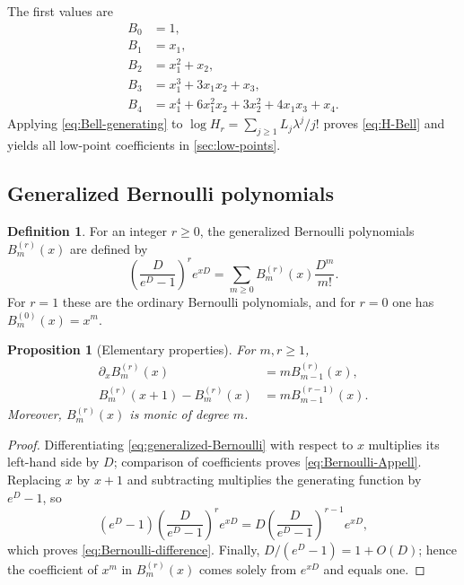 \documentclass[11pt,a4paper]{amsart}
\numberwithin{equation}{section}
\newtheorem{proposition}[theorem]{Proposition}
\theoremstyle{definition}
\newtheorem{definition}[theorem]{Definition}
\theoremstyle{remark}
\newcommand{\e}{e}
\begin{document}
The first values are
\begin{align*}
 B_0&=1,\\
 B_1&=x_1,\\
 B_2&=x_1^2+x_2,\\
 B_3&=x_1^3+3x_1x_2+x_3,\\
 B_4&=x_1^4+6x_1^2x_2+3x_2^2+4x_1x_3+x_4.
\end{align*}
Applying \eqref{eq:Bell-generating} to
$\log H_r=\sum_{j\geq1}L_j\lambda^j/j!$ proves
\eqref{eq:H-Bell} and yields all low-point coefficients in
\cref{sec:low-points}.

\subsection{Generalized Bernoulli polynomials}
\label{app:bernoulli}

\begin{definition}
For an integer $r\geq0$, the generalized Bernoulli polynomials
$B_m^{(r)}(x)$ are defined by
\begin{equation}
 \left(\frac{D}{\e^D-1}\right)^r\e^{xD}
 =\sum_{m\geq0}B_m^{(r)}(x)\frac{D^m}{m!}.
 \label{eq:generalized-Bernoulli}
\end{equation}
For $r=1$ these are the ordinary Bernoulli polynomials, and for $r=0$
one has $B_m^{(0)}(x)=x^m$.
\end{definition}

\begin{proposition}[Elementary properties]
\label{prop:Bernoulli-properties}
For $m,r\geq1$,
\begin{align}
 \partial_xB_m^{(r)}(x)&=mB_{m-1}^{(r)}(x),
 \label{eq:Bernoulli-Appell}\\
 B_m^{(r)}(x+1)-B_m^{(r)}(x)
 &=mB_{m-1}^{(r-1)}(x).
 \label{eq:Bernoulli-difference}
\end{align}
Moreover, $B_m^{(r)}(x)$ is monic of degree $m$.
\end{proposition}

\begin{proof}
Differentiating \eqref{eq:generalized-Bernoulli} with respect to $x$
multiplies its left-hand side by $D$; comparison of coefficients proves
\eqref{eq:Bernoulli-Appell}.  Replacing $x$ by $x+1$ and subtracting
multiplies the generating function by $\e^D-1$, so
\begin{equation*}
 (\e^D-1)\left(\frac{D}{\e^D-1}\right)^r\e^{xD}
 =D\left(\frac{D}{\e^D-1}\right)^{r-1}\e^{xD},
\end{equation*}
which proves \eqref{eq:Bernoulli-difference}.  Finally,
$D/(\e^D-1)=1+O(D)$; hence the coefficient of $x^m$ in
$B_m^{(r)}(x)$ comes solely from $\e^{xD}$ and equals one.
\end{proof}
\end{document}
